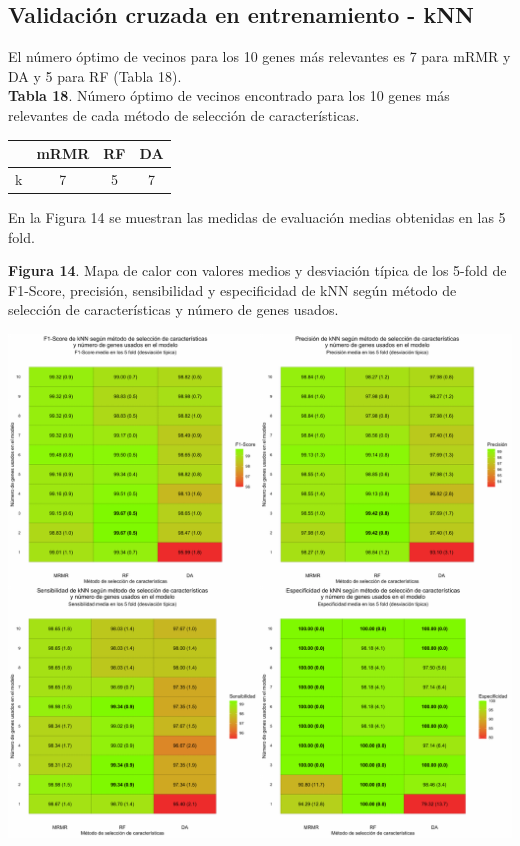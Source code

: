 \subsection{Validación cruzada en entrenamiento - kNN}

El número óptimo de vecinos para los 10 genes más relevantes es 7 para mRMR y DA y 5 para RF (Tabla 18).\\

\textbf{Tabla 18}. Número óptimo de vecinos encontrado para los 10 genes más relevantes de cada método de selección de características.

\begin{table}[H]
	\centering
	\begin{tabular}{cccc}
		\cline{2-4}
		\textbf{} & \textbf{mRMR} & \textbf{RF} & \textbf{DA} \\ \hline
		k                &    7 &    5     &   7      \\ \hline
	\end{tabular}
\end{table}

En la Figura 14 se muestran las medidas de evaluación medias obtenidas en las 5 fold.\\

\newpage
\begin{center}
\textbf{Figura 14}. Mapa de calor con valores medios y desviación típica de los 5-fold de F1-Score, precisión, sensibilidad y especificidad de kNN según método de selección de características y número de genes usados.
\end{center}
\begin{center}
	\includegraphics[width=1\textwidth]{figuras/14_higado_biclase_heatmap_knn.pdf} 
\end{center}

